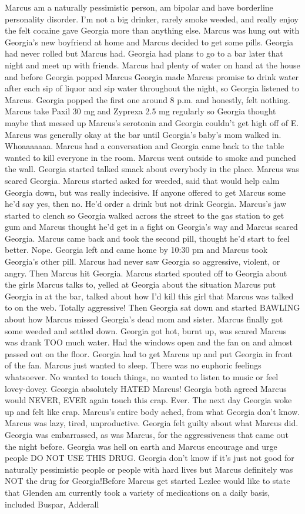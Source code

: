 \documentclass[12pt]{book}
\begin{document}
Marcus am a naturally pessimistic person, am bipolar and have borderline personality disorder. I'm not a big drinker, rarely smoke weeded, and really enjoy the felt cocaine gave Georgia more than anything else. Marcus was hung out with Georgia's new boyfriend at home and Marcus decided to get some pills. Georgia had never rolled but Marcus had. Georgia had plans to go to a bar later that night and meet up with friends. Marcus had plenty of water on hand at the house and before Georgia popped Marcus Georgia made Marcus promise to drink water after each sip of liquor and sip water throughout the night, so Georgia listened to Marcus. Georgia popped the first one around 8 p.m. and honestly, felt nothing. Marcus take Paxil 30 mg and Zyprexa 2.5 mg regularly so Georgia thought maybe that messed up Marcus's serotonin and Georgia couldn't get high off of E. Marcus was generally okay at the bar until Georgia's baby's mom walked in. Whoaaaaaaa. Marcus had a conversation and Georgia came back to the table wanted to kill everyone in the room. Marcus went outside to smoke and punched the wall. Georgia started talked smack about everybody in the place. Marcus was scared Georgia. Marcus started asked for weeded, said that would help calm Georgia down, but was really indecisive. If anyone offered to get Marcus some he'd say yes, then no. He'd order a drink but not drink Georgia. Marcus's jaw started to clench so Georgia walked across the street to the gas station to get gum and Marcus thought he'd get in a fight on Georgia's way and Marcus scared Georgia. Marcus came back and took the second pill, thought he'd start to feel better. Nope. Georgia left and came home by 10:30 pm and Marcus took Georgia's other pill. Marcus had never saw Georgia so aggressive, violent, or angry. Then Marcus hit Georgia. Marcus started spouted off to Georgia about the girls Marcus talks to, yelled at Georgia about the situation Marcus put Georgia in at the bar, talked about how I'd kill this girl that Marcus was talked to on the web. Totally aggressive! Then Georgia sat down and started BAWLING about how Marcus missed Georgia's dead mom and sister. Marcus finally got some weeded and settled down. Georgia got hot, burnt up, was scared Marcus was drank TOO much water. Had the windows open and the fan on and almost passed out on the floor. Georgia had to get Marcus up and put Georgia in front of the fan. Marcus just wanted to sleep. There was no euphoric feelings whatsoever. No wanted to touch things, no wanted to listen to music or feel lovey-dovey. Georgia absolutely HATED Marcus! Georgia both agreed Marcus would NEVER, EVER again touch this crap. Ever. The next day Georgia woke up and felt like crap. Marcus's entire body ached, from what Georgia don't know. Marcus was lazy, tired, unproductive. Georgia felt guilty about what Marcus did. Georgia was embarrassed, as was Marcus, for the aggressiveness that came out the night before. Georgia was hell on earth and Marcus encourage and urge people DO NOT USE THIS DRUG. Georgia don't know if it's just not good for naturally pessimistic people or people with hard lives but Marcus definitely was NOT the drug for Georgia!Before Marcus get started Lezlee would like to state that Glenden am currently took a variety of medications on a daily basis, included Buspar, Adderall 
\end{document}
